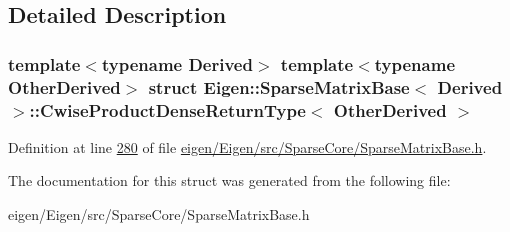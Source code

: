 \subsection{Detailed Description}
\subsubsection*{template$<$typename Derived$>$\newline
template$<$typename Other\+Derived$>$\newline
struct Eigen\+::\+Sparse\+Matrix\+Base$<$ Derived $>$\+::\+Cwise\+Product\+Dense\+Return\+Type$<$ Other\+Derived $>$}



Definition at line \hyperlink{eigen_2_eigen_2src_2_sparse_core_2_sparse_matrix_base_8h_source_l00280}{280} of file \hyperlink{eigen_2_eigen_2src_2_sparse_core_2_sparse_matrix_base_8h_source}{eigen/\+Eigen/src/\+Sparse\+Core/\+Sparse\+Matrix\+Base.\+h}.



The documentation for this struct was generated from the following file\+:\begin{DoxyCompactItemize}
\item 
eigen/\+Eigen/src/\+Sparse\+Core/\+Sparse\+Matrix\+Base.\+h\end{DoxyCompactItemize}
